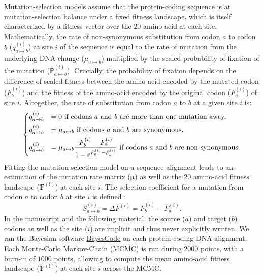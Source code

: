 \documentclass{article}
\newcommand{\UniDimArray}[1]{\bm{#1}}
\newcommand{\e}{\textrm{e}}
\newcommand{\proba}{\mathbb{P}}
\begin{document}
    Mutation-selection models assume that the protein-coding sequence is at mutation-selection balance under a fixed fitness landscape, which is itself characterized by a fitness vector over the $20$ amino-acid at each site\cite{yang_mutationselection_2008, halpern_evolutionary_1998, rodrigue_mechanistic_2010}.
    Mathematically, the rate of non-synonymous substitution from codon $a$ to codon $b$ ($q_{a \mapsto b}^{(i)}$) at site $i$ of the sequence is equal to the rate of mutation from the underlying DNA change ($\mu_{a \mapsto b}$) multiplied by the scaled probability of fixation of the mutation ($\proba_{a \mapsto b}^{(i)}$).
    Crucially, the probability of fixation depends on the difference of scaled fitness between the amino-acid encoded by the mutated codon ($F_b^{(i)}$) and the fitness of the amino-acid encoded by the original codon ($F_a^{(i)}$) of site $i$\cite{wright_evolution_1931, fisher_genetical_1930}.
    Altogether, the rate of substitution from codon $a$ to $b$ at a given site $i$ is:
    \begin{equation}
        \begin{dcases}
            q_{a \mapsto b}^{(i)} & = 0 \text{ if codons $a$ and $b$ are more than one mutation away,} \\
            q_{a \mapsto b}^{(i)} & = \mu_{a \mapsto b} \text{ if codons $a$ and $b$ are synonymous,} \\
            q_{a \mapsto b}^{(i)} & = \mu_{a \mapsto b} \dfrac{F_b^{(i)} - F_a^{(i)}}{1 - \e^{F_a^{(i)} - F_b^{(i)}}} \text{ if codons $a$ and $b$ are non-synonymous}.
        \end{dcases}
    \end{equation}
    Fitting the mutation-selection model on a sequence alignment leads to an estimation of the mutation rate matrix ($\UniDimArray{\mu}$) as well as the 20 amino-acid fitness landscape ($\UniDimArray{F^{(i)}}$) at each site $i$.
    The selection coefficient for a mutation from codon $a$ to codon $b$ at site $i$ is defined :
    \begin{equation}
        S_{a \mapsto b}^{(i)} = \Delta F^{(i)} = F^{(i)}_{b} - F^{(i)}_{a}.
    \end{equation}
    In the manuscript and the following material, the source ($a$) and target ($b$) codons as well as the site ($i$) are implicit and thus never explicitly written.
    We ran the Bayesian software \href{https://github.com/bayesiancook/bayescode}{BayesCode} on each protein-coding DNA alignment\cite{lartillot_phylobayes_2013, rodrigue_detecting_2017, rodrigue_bayesian_2021}.
    Each Monte-Carlo Markov-Chain (MCMC) is run during $2000$ points, with a burn-in of $1000$ points, allowing to compute the mean amino-acid fitness landscape ($\UniDimArray{F^{(i)}}$) at each site $i$ across the MCMC\@.
\end{document}
